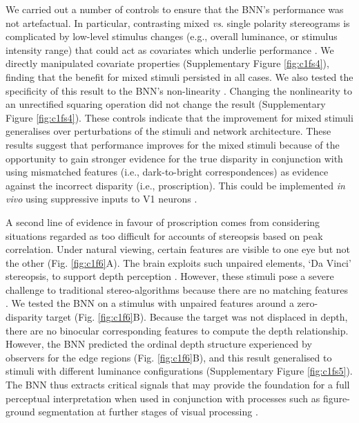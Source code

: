 {We carried out a number of controls to ensure that the BNN's performance was not artefactual. In particular, contrasting mixed {\it vs}. single polarity stereograms is complicated by low-level stimulus changes (e.g., overall luminance, or stimulus intensity range) that could act as covariates which underlie performance \cite{Read:2011im}. We directly manipulated covariate properties (Supplementary Figure \ref{fig:c1fs4}), finding that the benefit for mixed stimuli persisted in all cases. We also tested the specificity of this result to the BNN's non-linearity \cite{Read:2011im}. Changing the nonlinearity to an unrectified squaring operation did not change the result (Supplementary Figure \ref{fig:c1fs4}). These controls indicate that the improvement for mixed stimuli generalises over perturbations of the stimuli and network architecture. These results suggest that performance improves for the mixed stimuli because of the opportunity to gain stronger evidence for the true disparity in conjunction with using mismatched features (i.e., dark-to-bright correspondences) as evidence against the incorrect disparity (i.e., proscription). This could be implemented {\it in vivo} using suppressive inputs to V1 neurons \cite{Tanabe:2011pt}.

A second line of evidence in favour of proscription comes from considering situations regarded as too difficult for accounts of stereopsis based on peak correlation. Under natural viewing, certain features are visible to one eye but not the other (Fig. \ref{fig:c1f6}A). The brain exploits such unpaired elements, `Da Vinci' stereopsis, to support depth perception \cite{Gillam:1988lo, Nakayama:1990fc}. However, these stimuli pose a severe challenge to traditional stereo-algorithms because there are no matching features \cite{Anderson:1994tp}. We tested the BNN on a stimulus with unpaired features around a zero-disparity target (Fig. \ref{fig:c1f6}B). Because the target was not displaced in depth, there are no binocular corresponding features to compute the depth relationship. However, the BNN predicted the ordinal depth structure experienced by observers for the edge regions (Fig. \ref{fig:c1f6}B), and this result generalised to stimuli with different luminance configurations (Supplementary Figure \ref{fig:c1fs5}). The BNN thus extracts critical signals that may provide the foundation for a full perceptual interpretation when used in conjunction with processes such as figure-ground segmentation at further stages of visual processing \cite{Ban:2015cr, Tsirlin2014}.

}
